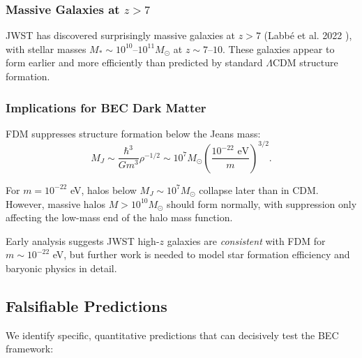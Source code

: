 \documentclass[11pt,a4paper]{article}
\newcommand{\Msun}{\ensuremath{M_\odot}}
\theoremstyle{definition}
\theoremstyle{remark}
\begin{document}
\subsubsection{Massive Galaxies at $z > 7$}

JWST has discovered surprisingly massive galaxies at $z > 7$ (Labb\'e et al. 2022 \cite{Labbe2022}), with stellar masses $M_* \sim 10^{10}$--$10^{11} \Msun$ at $z \sim 7$--$10$. These galaxies appear to form earlier and more efficiently than predicted by standard $\Lambda$CDM structure formation.

\subsubsection{Implications for BEC Dark Matter}

FDM suppresses structure formation below the Jeans mass:
\begin{equation}
M_J \sim \frac{\hbar^3}{G m^3} \rho^{-1/2} \sim 10^7 \Msun \left(\frac{10^{-22} \text{ eV}}{m}\right)^{3/2}.
\end{equation}

For $m = 10^{-22}$ eV, halos below $M_J \sim 10^7 \Msun$ collapse later than in CDM. However, massive halos $M > 10^{10} \Msun$ should form normally, with suppression only affecting the low-mass end of the halo mass function.

Early analysis suggests JWST high-$z$ galaxies are \emph{consistent} with FDM for $m \sim 10^{-22}$ eV, but further work is needed to model star formation efficiency and baryonic physics in detail.

\subsection{Falsifiable Predictions}
\label{sec:falsifiable}

We identify specific, quantitative predictions that can decisively test the BEC framework:
\end{document}

